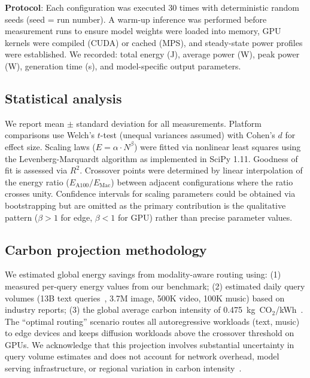 \documentclass[preprint,12pt]{elsarticle}
\begin{document}
\textbf{Protocol}: Each configuration was executed 30 times with deterministic random seeds (seed = run number). A warm-up inference was performed before measurement runs to ensure model weights were loaded into memory, GPU kernels were compiled (CUDA) or cached (MPS), and steady-state power profiles were established. We recorded: total energy (J), average power (W), peak power (W), generation time (s), and model-specific output parameters.

\subsection{Statistical analysis}

We report mean $\pm$ standard deviation for all measurements. Platform comparisons use Welch's $t$-test (unequal variances assumed) with Cohen's $d$ for effect size. Scaling laws ($E = \alpha \cdot N^\beta$) were fitted via nonlinear least squares using the Levenberg-Marquardt algorithm as implemented in SciPy 1.11. Goodness of fit is assessed via $R^2$. Crossover points were determined by linear interpolation of the energy ratio ($E_\text{A100}/E_\text{Mac}$) between adjacent configurations where the ratio crosses unity. Confidence intervals for scaling parameters could be obtained via bootstrapping but are omitted as the primary contribution is the qualitative pattern ($\beta > 1$ for edge, $\beta < 1$ for GPU) rather than precise parameter values.

\subsection{Carbon projection methodology}

We estimated global energy savings from modality-aware routing using: (1) measured per-query energy values from our benchmark; (2) estimated daily query volumes (13B text queries~\cite{devries2023growing}, 3.7M image, 500K video, 100K music) based on industry reports; (3) the global average carbon intensity of 0.475~kg~CO$_2$/kWh~\cite{iea2024}. The ``optimal routing'' scenario routes all autoregressive workloads (text, music) to edge devices and keeps diffusion workloads above the crossover threshold on GPUs. We acknowledge that this projection involves substantial uncertainty in query volume estimates and does not account for network overhead, model serving infrastructure, or regional variation in carbon intensity~\cite{dodge2022measuring}.

\end{document}
